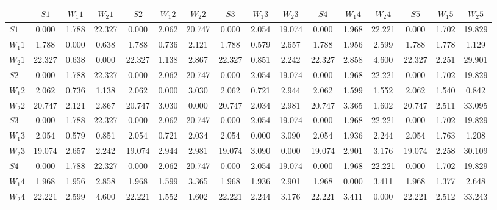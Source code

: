 \begin{table*}[h!]
\begin{center}
\begin{tabular}{| l | c | c | c | c | c | c | c | c | c | c | c | c | c | c | c |}\hline
 & $S1$ & $W_1 1$ & $W_2 1$ & $S2$ & $W_1 2$ & $W_2 2$ & $S3$ & $W_1 3$ & $W_2 3$ & $S4$ & $W_1 4$ & $W_2 4$ & $S5$ & $W_1 5$ & $W_2 5$ \\\hline
$S1$ & 0.000  & 1.788  & 22.327  & 0.000  & 2.062  & 20.747  & 0.000  & 2.054  & 19.074  & 0.000  & 1.968  & 22.221  & 0.000  & 1.702  & 19.829 \\\hline
$W_1 1$ & 1.788  & 0.000  & 0.638  & 1.788  & 0.736  & 2.121  & 1.788  & 0.579  & 2.657  & 1.788  & 1.956  & 2.599  & 1.788  & 1.778  & 1.129 \\\hline
$W_2 1$ & 22.327  & 0.638  & 0.000  & 22.327  & 1.138  & 2.867  & 22.327  & 0.851  & 2.242  & 22.327  & 2.858  & 4.600  & 22.327  & 2.251  & 29.901 \\\hline
$S2$ & 0.000  & 1.788  & 22.327  & 0.000  & 2.062  & 20.747  & 0.000  & 2.054  & 19.074  & 0.000  & 1.968  & 22.221  & 0.000  & 1.702  & 19.829 \\\hline
$W_1 2$ & 2.062  & 0.736  & 1.138  & 2.062  & 0.000  & 3.030  & 2.062  & 0.721  & 2.944  & 2.062  & 1.599  & 1.552  & 2.062  & 1.540  & 0.842 \\\hline
$W_2 2$ & 20.747  & 2.121  & 2.867  & 20.747  & 3.030  & 0.000  & 20.747  & 2.034  & 2.981  & 20.747  & 3.365  & 1.602  & 20.747  & 2.511  & 33.095 \\\hline
$S3$ & 0.000  & 1.788  & 22.327  & 0.000  & 2.062  & 20.747  & 0.000  & 2.054  & 19.074  & 0.000  & 1.968  & 22.221  & 0.000  & 1.702  & 19.829 \\\hline
$W_1 3$ & 2.054  & 0.579  & 0.851  & 2.054  & 0.721  & 2.034  & 2.054  & 0.000  & 3.090  & 2.054  & 1.936  & 2.244  & 2.054  & 1.763  & 1.208 \\\hline
$W_2 3$ & 19.074  & 2.657  & 2.242  & 19.074  & 2.944  & 2.981  & 19.074  & 3.090  & 0.000  & 19.074  & 2.901  & 3.176  & 19.074  & 2.258  & 30.109 \\\hline
$S4$ & 0.000  & 1.788  & 22.327  & 0.000  & 2.062  & 20.747  & 0.000  & 2.054  & 19.074  & 0.000  & 1.968  & 22.221  & 0.000  & 1.702  & 19.829 \\\hline
$W_1 4$ & 1.968  & 1.956  & 2.858  & 1.968  & 1.599  & 3.365  & 1.968  & 1.936  & 2.901  & 1.968  & 0.000  & 3.411  & 1.968  & 1.377  & 2.648 \\\hline
$W_2 4$ & 22.221  & 2.599  & 4.600  & 22.221  & 1.552  & 1.602  & 22.221  & 2.244  & 3.176  & 22.221  & 3.411  & 0.000  & 22.221  & 2.512  & 33.243 \\\hline

\end{tabular}
\end{center}
\end{table*}
